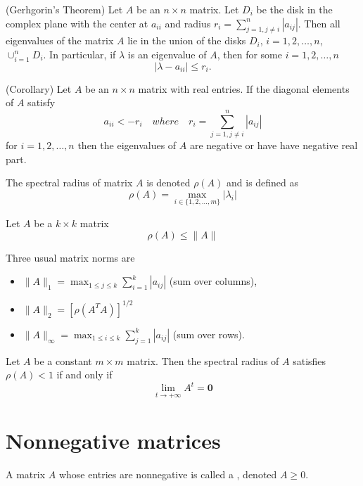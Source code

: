 \begin{atheorem}(Gerhgorin's Theorem)
Let $A$ be an $n\times n$ matrix. Let $D_i$ be the disk in the complex plane with the center at $a_{ii}$ and radius $r_i=\sum _{j=1,j\not =i}^n|a_{ij}|$. Then all eigenvalues of the matrix $A$ lie in the union of the disks $D_i$, $i=1,2,\dots, n$, $\cup_{i=1}^nD_i$. In particular, if $\lambda $ is an eigenvalue of $A$, then for some $i=1,2,\dots,n$
$$|\lambda -a_{ii}|\leq r_i.$$
\end{atheorem}

\begin{atheorem}(Corollary)
Let $A$ be an $n\times n$ matrix with real entries. If the diagonal elements of $A$ satisfy 
$$a_{ii}<-r_{i} \quad where \quad r_i=\sum _{j=1,j\not =i}^n|a_{ij}|$$
for $i=1,2,\dots,n$ then the eigenvalues of $A$ are negative or have have negative real part.
\end{atheorem}

\begin{definition}
The spectral radius of matrix $A$ is denoted $\rho(A)$ and is defined as
$$\rho(A)=\max_{i\in \{1,2,\dots,m\}}|\lambda_i|$$
\end{definition}


\begin{theorem}\label{Theo:NormRho}
Let $A$ be a $k\times k$ matrix
$$\rho(A)\leq \| A\| $$
\end{theorem}

Three usual matrix norms are
\begin{itemize}
\item $ \| A\|_1=\max_{1\leq j\leq k}\sum_{i=1}^k|a_{ij}|$ (sum over columns),
\item $ \|A\|_2=[\rho(A^TA)]^{1/2}$
\item $\|A\|_{\infty}=\max_{1\leq i\leq k}\sum_{j=1}^k|a_{ij}|$ (sum over rows).
\end{itemize}


\begin{theorem}\label{th:MatrixConvergence}
Let $A$ be a constant $m \times m$ matrix. Then the spectral radius of $A$ satisfies $\rho(A)<1$ if and only if $$\lim_{t\rightarrow + \infty}A^t=\mathbf{0}$$
\end{theorem}



\section{Nonnegative matrices}
\begin{definition}
A matrix $A$ whose entries are nonnegative is called a , denoted $A\geq 0$.
\end{definition}


